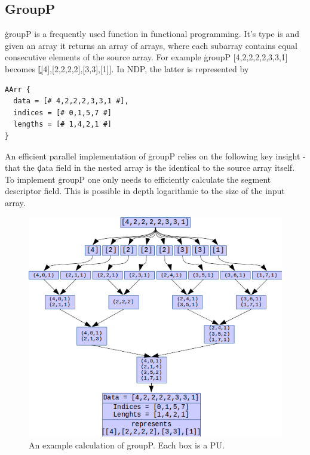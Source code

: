   \subsection*{GroupP}
    \c{groupP} is a frequently used function in functional programming.
    It's type is \type{[:a:] -> [:[:a:]:]} and given an array it returns an array of arrays,
    where each subarray contains equal consecutive
    elements of the source array. For example
    \c{groupP [4,2,2,2,2,3,3,1]} becomes \c{[[4],[2,2,2,2],[3,3],[1]]}.
    In NDP, the latter is represented by
    \begin{lstlisting}
AArr {
  data = [# 4,2,2,2,3,3,1 #],
  indices = [# 0,1,5,7 #]
  lengths = [# 1,4,2,1 #]
}
    \end{lstlisting}
    An efficient parallel implementation of \c{groupP}
    relies on the following key insight - that the \c{data} field in the nested array
    is the identical to the source array itself. To implement \c{groupP} one only
    needs to efficiently calculate the segment descriptor field. This is
    possible in depth logarithmic to the size of the input array.
    
    \begin{figure}[h!]
        \begin{center}
        \includegraphics[width=\linewidth]{groupP.png}
        \caption{An example calculation of groupP. Each box is a PU.}
        \label{figure:groupP}
        \end{center}
    \end{figure}
    
